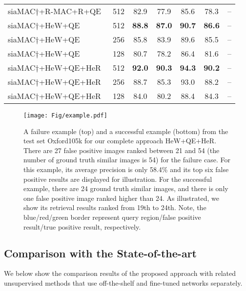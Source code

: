 \documentclass[journal]{IEEEtran}
\begin{document}
\begin{table*}[t]
\begin{center}
\begin{tabular}{|l|c| c c c c c|}
  siaMAC$\dagger$+R-MAC+R+QE~\cite{radenovic2016cnn}     &512   &82.9  &77.9   &85.6    &78.3    &--\\
  siaMAC$\dagger$+HeW+QE                                &512   &\textbf{88.8}  &\textbf{87.0}   &\textbf{90.7}  &\textbf{86.6 }  &-- \\
  siaMAC$\dagger$+HeW+QE                                &256   &85.8  &83.9   &89.6  &85.5  &-- \\
  siaMAC$\dagger$+HeW+QE                                &128   &80.7  &78.2   &86.4  &81.6  &-- \\
  \hline
  \hline
  siaMAC$\dagger$+HeW+QE+HeR                   &512    &\textbf{92.0}  &\textbf{90.3}     &\textbf{94.3}     &\textbf{90.2}     &--\\
  siaMAC$\dagger$+HeW+QE+HeR                   &256    &88.7   &85.3     &93.0     &88.2     &--\\
  siaMAC$\dagger$+HeW+QE+HeR                   &128    &84.0   &80.2     &88.4     &84.3    &--\\
  \hline
\end{tabular}
\end{center}
\end{table*}

\begin{figure*}[t]
\centering
\texttt{[image: Fig/example.pdf]}
\caption{A failure example (top) and a successful example (bottom) from the test set Oxford105k for our complete approach HeW+QE+HeR.
There are 27 false positive images ranked between 21 and 54 (the number of ground truth similar images is 54) for the failure case.
For this example, its average precision is only 58.4\% and its top six false positive results are displayed for illustration.
For the successful example, there are 24 ground truth similar images, and there is only one false positive image ranked higher than 24.
As illustrated, we show its retrieval results ranked from 19th to 24th. Note, the blue/red/green border represent query region/false positive result/true positive result, respectively.}
\label{fig:ox105k_qer}
\end{figure*}


\subsection{Comparison with the State-of-the-art}
We below show the comparison results of the proposed approach with related
unsupervised methods that use off-the-shelf  and fine-tuned networks separately.
\end{document}
